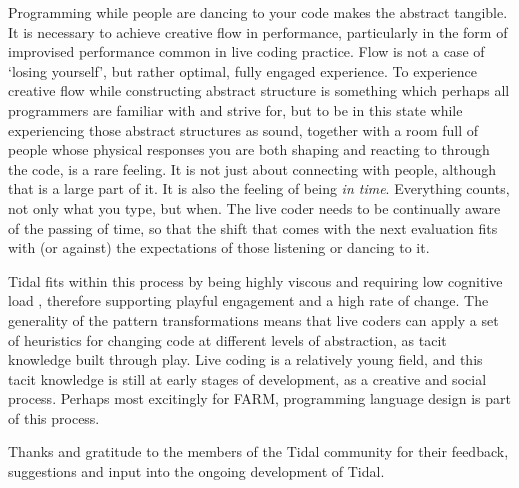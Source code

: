 \documentclass[authoryear,preprint]{sigplanconf}
\begin{document}
Programming while people are dancing to your code makes the abstract
tangible. It is necessary to achieve creative flow in performance,
particularly in the form of improvised performance common in live
coding practice. Flow is not a case of `losing yourself', but rather
optimal, fully engaged experience. To experience creative flow while
constructing abstract structure is something which perhaps all
programmers are familiar with and strive for, but to be in this state
while experiencing those abstract structures as sound,
together with a room full of people whose physical responses you are
both shaping and reacting to through the code, is a rare feeling. It
is not just about connecting with people, although that is a large
part of it. It is also the feeling of being \emph{in time}. Everything
counts, not only what you type, but when. The live coder needs to be
continually aware of the passing of time, so that the shift that comes
with the next evaluation fits with (or against) the expectations of
those listening or dancing to it.

Tidal fits within this process by being highly viscous and requiring
low cognitive load \citep{Green00}, therefore supporting playful
engagement and a high rate of change. The generality of the pattern
transformations means that live coders can apply a set of heuristics
for changing code at different levels of abstraction, as tacit
knowledge built through play. Live coding is a relatively young field,
and this tacit knowledge is still at early stages of development, as a
creative and social process. Perhaps most excitingly for FARM,
programming language design is part of this process.

\acks

Thanks and gratitude to the members of the Tidal community for their
feedback, suggestions and input into the ongoing development of Tidal.





\end{document}
